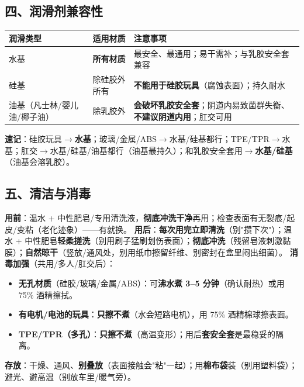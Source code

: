 \documentclass[12pt,UTF8,openany]{ctexbook}
\begin{document}
\subsection*{四、润滑剂兼容性}
\begin{tabularx}{\textwidth}{X X X}
\toprule
\textbf{润滑类型} & \textbf{适用材质} & \textbf{注意事项} \\
\midrule
水基 & \textbf{所有材质} & 最安全、最通用；易干需补；与乳胶安全套兼容 \\
硅基 & 除硅胶外所有 & \textbf{不能用于硅胶玩具}（腐蚀表面）；持久耐水 \\
油基（凡士林/婴儿油/椰子油） & 除乳胶外 & \textbf{会破坏乳胶安全套}；阴道内易致菌群失衡、\textbf{不建议阴道内用}；肛交可用 \\
\bottomrule
\end{tabularx}
\par\smallskip
\textbf{速记}：硅胶玩具$\to$\textbf{水基}；玻璃/金属/ABS$\to$水基/硅基都行；TPE/TPR$\to$水基；肛交$\to$水基/硅基/油基都行（油基最持久）；和乳胶安全套用$\to$\textbf{水基/硅基}（油基会溶乳胶）。

\subsection*{五、清洁与消毒}
\textbf{用前}：温水 + 中性肥皂/专用清洗液，\textbf{彻底冲洗干净}再用；检查表面有无裂痕/起皮/变粘（老化迹象）——有就换。
\textbf{用后}：\textbf{每次用完立即清洗}（别"攒下次"）；温水 + 中性肥皂\textbf{轻柔搓洗}（别用刷子猛刷划伤表面）；\textbf{彻底冲洗}（残留皂液刺激黏膜）；\textbf{自然晾干}（竖放/通风处，别用纸巾擦留纤维、别密封在盒里闷出细菌）。
\textbf{消毒加强}（共用/多人/肛交后）：
\begin{itemize}[leftmargin=2em,itemsep=0.2em]
  \item \textbf{无孔材质}（硅胶/玻璃/金属/ABS）：可\textbf{沸水煮 3--5 分钟}（确认耐热）或用 75\% 酒精擦拭。
  \item \textbf{有电机/电池的玩具}：\textbf{只擦不煮}（水会短路电机），用 75\% 酒精棉球擦表面。
  \item \textbf{TPE/TPR（多孔）}：\textbf{只擦不煮}（高温变形）；用后\textbf{套安全套}是最稳妥的隔离。
\end{itemize}
\textbf{存放}：干燥、通风、\textbf{别叠放}（表面接触会"粘"一起）；用\textbf{棉布袋}装（别用塑料袋）；避光、避高温（别放车里/暖气旁）。
\end{document}
